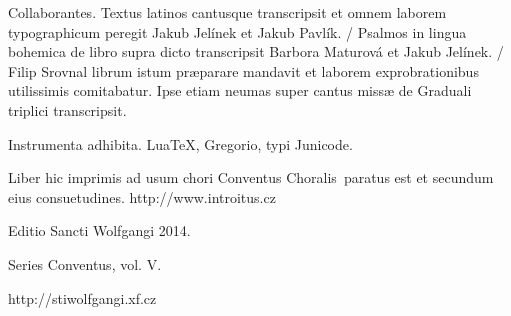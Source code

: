 \documentclass[a4paper, twoside, 12pt]{article}
\newcommand{\annusEditionis}{2014}
\begin{document}
Collaborantes.
Textus latinos cantusque transcripsit et omnem laborem typographicum peregit
Jakub Jelínek et Jakub Pavlík. /
Psalmos in lingua bohemica de libro supra dicto transcripsit
Barbora Maturová et Jakub Jelínek. /
Filip Srovnal librum istum præparare mandavit et laborem exprobrationibus
utilissimis comitabatur. Ipse etiam neumas super cantus missæ
de Graduali triplici transcripsit.

Instrumenta adhibita.
LuaTeX, %
Gregorio, %
typi Junicode. %

\begin{center}
Liber hic imprimis ad usum chori
\guillemotright Conventus Choralis\guillemotleft\
paratus est
et secundum eius consuetudines.
http://www.introitus.cz

\vspace{1cm}

{\large Editio Sancti Wolfgangi \annusEditionis.}

\vspace{2mm}

Series \guillemotright Conventus\guillemotleft, vol. V.

\vspace{1cm}

http://stiwolfgangi.xf.cz

\end{center}

\vfill
\end{document}
